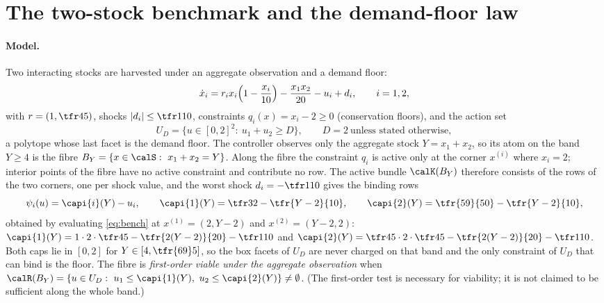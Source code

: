 \section{The two-stock benchmark and the demand-floor law}\label{sec:benchmark}

\paragraph{Model.} Two interacting stocks are harvested under an aggregate observation and a demand floor:
\begin{equation}\label{eq:bench}
\dot x_i=r_ix_i\Bigl(1-\frac{x_i}{10}\Bigr)-\frac{x_1x_2}{20}-u_i+d_i,\qquad i=1,2,
\end{equation}
with $r=(1,\tfr45)$, shocks $|d_i|\le\tfr1{10}$, constraints $q_i(x)=x_i-2\ge0$ (conservation floors), and the action set
\begin{equation}\label{eq:benchU}
U_D=\bigl\{u\in[0,2]^2:\ u_1+u_2\ge D\bigr\},\qquad D=2\ \text{unless stated otherwise},
\end{equation}
a polytope whose last facet is the demand floor. The controller observes only the aggregate stock $Y=x_1+x_2$, so its atom on the band $Y\ge4$ is the fibre $B_Y=\{x\in\calS:\ x_1+x_2=Y\}$. Along the fibre the constraint $q_i$ is active only at the corner $x^{(i)}$ where $x_i=2$; interior points of the fibre have no active constraint and contribute no row. The active bundle $\calK(B_Y)$ therefore consists of the rows of the two corners, one per shock value, and the worst shock $d_i=-\tfr1{10}$ gives the binding rows
\begin{equation}\label{eq:caps}
\psi_i(u)=\capi{i}(Y)-u_i,\qquad \capi{1}(Y)=\tfr32-\tfr{Y-2}{10},\qquad \capi{2}(Y)=\tfr{59}{50}-\tfr{Y-2}{10},
\end{equation}
obtained by evaluating \eqref{eq:bench} at $x^{(1)}=(2,Y-2)$ and $x^{(2)}=(Y-2,2)$: $\capi{1}(Y)=1\cdot2\cdot\tfr45-\tfr{2(Y-2)}{20}-\tfr1{10}$ and $\capi{2}(Y)=\tfr45\cdot2\cdot\tfr45-\tfr{2(Y-2)}{20}-\tfr1{10}$. Both caps lie in $[0,2]$ for $Y\in[4,\tfr{69}5]$, so the box facets of $U_D$ are never charged on that band and the only constraint of $U_D$ that can bind is the floor. The fibre is \emph{first-order viable under the aggregate observation} when $\calR(B_Y)=\{u\in U_D:\ u_1\le\capi{1}(Y),\ u_2\le\capi{2}(Y)\}\neq\emptyset$. (The first-order test is necessary for viability; it is not claimed to be sufficient along the whole band.)

